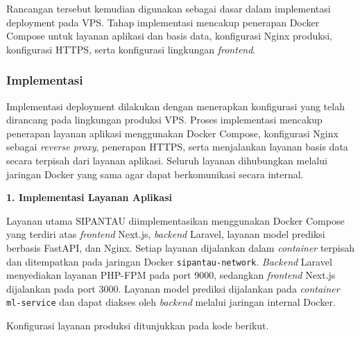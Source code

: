 Rancangan tersebut kemudian digunakan sebagai dasar dalam implementasi deployment pada VPS. Tahap implementasi mencakup penerapan Docker Compose untuk layanan aplikasi dan basis data, konfigurasi Nginx produksi, konfigurasi HTTPS, serta konfigurasi lingkungan \textit{frontend}.

\subsubsection{Implementasi}

Implementasi deployment dilakukan dengan menerapkan konfigurasi yang telah dirancang pada lingkungan produksi VPS. Proses implementasi mencakup penerapan layanan aplikasi menggunakan Docker Compose, konfigurasi Nginx sebagai \textit{reverse proxy}, penerapan HTTPS, serta menjalankan layanan basis data secara terpisah dari layanan aplikasi. Seluruh layanan dihubungkan melalui jaringan Docker yang sama agar dapat berkomunikasi secara internal.

\vspace{0.5em}
\noindent\textbf{1. Implementasi Layanan Aplikasi}
\vspace{0.5em}

Layanan utama SIPANTAU diimplementasikan menggunakan Docker Compose yang terdiri atas \textit{frontend} Next.js, \textit{backend} Laravel, layanan model prediksi berbasis FastAPI, dan Nginx. Setiap layanan dijalankan dalam \textit{container} terpisah dan ditempatkan pada jaringan Docker \texttt{sipantau-network}. \textit{Backend} Laravel menyediakan layanan PHP-FPM pada port 9000, sedangkan \textit{frontend} Next.js dijalankan pada port 3000. Layanan model prediksi dijalankan pada \textit{container} \texttt{ml-\allowbreak service} dan dapat diakses oleh \textit{backend} melalui jaringan internal Docker.

Konfigurasi layanan produksi ditunjukkan pada kode berikut.

